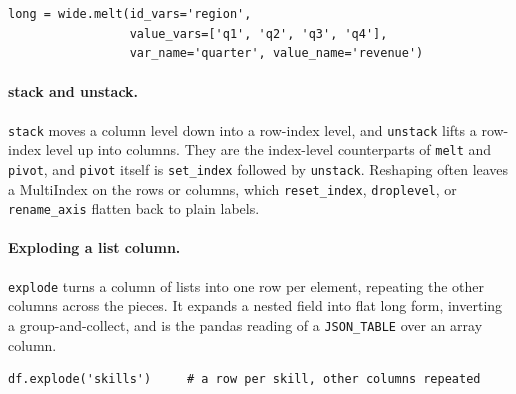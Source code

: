 \begin{lstlisting}[style=python, caption={Collapse quarter columns into rows}]
long = wide.melt(id_vars='region',
                 value_vars=['q1', 'q2', 'q3', 'q4'],
                 var_name='quarter', value_name='revenue')
\end{lstlisting}

\vspace{-2ex}

\paragraph{stack and unstack.} \texttt{stack} moves a column level down into a row-index level, and \texttt{unstack} lifts a row-index level up into columns. They are the index-level counterparts of \texttt{melt} and \texttt{pivot}, and \texttt{pivot} itself is \texttt{set\_index} followed by \texttt{unstack}. Reshaping often leaves a MultiIndex on the rows or columns, which \texttt{reset\_index}, \texttt{droplevel}, or \texttt{rename\_axis} flatten back to plain labels.

\paragraph{Exploding a list column.} \texttt{explode} turns a column of lists into one row per element, repeating the other columns across the pieces. It expands a nested field into flat long form, inverting a group-and-collect, and is the pandas reading of a \texttt{JSON\_TABLE} over an array column.

\begin{lstlisting}[style=python, caption={One row per element of each list}]
df.explode('skills')     # a row per skill, other columns repeated
\end{lstlisting}
